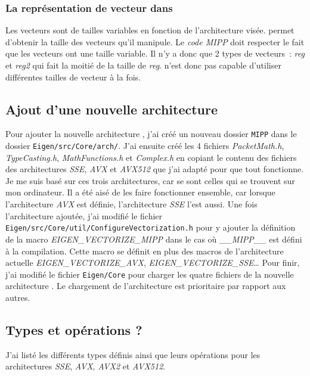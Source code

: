 \subsubsection{La représentation de vecteur dans \MIPP}
{
  Les vecteurs sont de tailles variables en fonction de l'architecture visée. \MIPP permet
  d'obtenir la taille des vecteurs qu'il manipule. Le \emph{code MIPP} doit respecter
  le fait que les vecteurs ont une taille variable. Il n'y a donc que 2 types de vecteurs :
  \emph{reg} et \emph{reg2} qui fait la moitié de la taille de \emph{reg}.
  \MIPP n'est donc pas capable d'utiliser différentes tailles de vecteur à la fois.
}

\subsection{Ajout d'une nouvelle architecture \MIPP}

Pour ajouter la nouvelle architecture \MIPP, j'ai créé un nouveau dossier \verb|MIPP|
dans le dossier \verb|Eigen/src/Core/arch/|. J'ai ensuite créé les 4 fichiers
\emph{PacketMath.h}, \emph{TypeCasting.h}, \emph{MathFunctions.h} et \emph{Complex.h}
en copiant le contenu des fichiers des architectures \emph{SSE}, \emph{AVX} et \emph{AVX512}
que j'ai adapté pour que tout fonctionne. Je me suis basé sur ces trois architectures,
car se sont celles qui se trouvent sur mon ordinateur. Il a été aisé de les faire fonctionner
ensemble, car lorsque l'architecture \emph{AVX} est définie, l'architecture \emph{SSE} l'est
aussi.
Une fois l'architecture ajoutée, j'ai modifié le fichier
\verb|Eigen/src/Core/util/ConfigureVectorization.h| pour y ajouter la définition de la
macro \emph{EIGEN_VECTORIZE_MIPP} dans le cas où \emph{__MIPP__} est défini à la
compilation. Cette macro se définit en plus des macros de l'architecture actuelle
\emph{EIGEN_VECTORIZE_AVX}, \emph{EIGEN_VECTORIZE_SSE}\dots
Pour finir, j'ai modifié le fichier \verb|Eigen/Core| pour charger les quatre fichiers
de la nouvelle architecture \MIPP. Le chargement de l'architecture \MIPP est prioritaire
par rapport aux autres.

\subsection{Types et opérations \Eigen ?}

J'ai listé les différents types \Eigen définis ainsi que leurs opérations pour les
architectures \emph{SSE}, \emph{AVX}, \emph{AVX2} et \emph{AVX512}.

